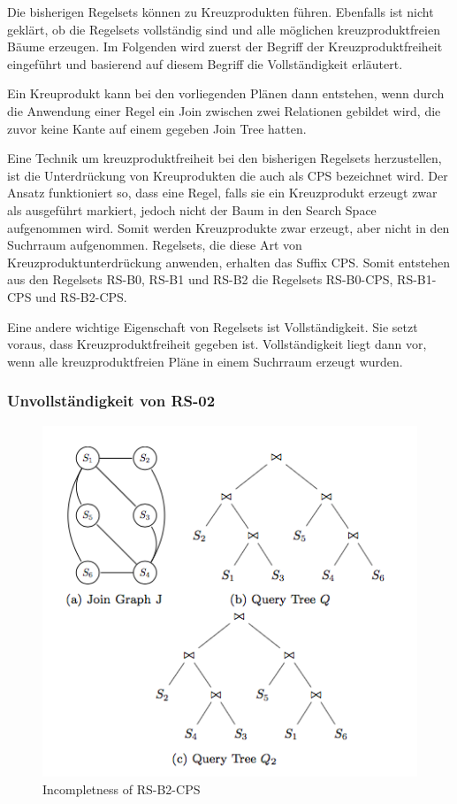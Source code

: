 Die bisherigen Regelsets können zu Kreuzprodukten führen. Ebenfalls ist nicht geklärt, ob die Regelsets vollständig sind und alle möglichen kreuzproduktfreien Bäume erzeugen. Im Folgenden wird zuerst der Begriff der Kreuzproduktfreiheit eingeführt und basierend auf diesem Begriff die Vollständigkeit erläutert.

Ein Kreuprodukt kann bei den vorliegenden Plänen dann entstehen, wenn durch die Anwendung einer Regel ein Join zwischen zwei Relationen gebildet wird, die zuvor keine Kante auf einem gegeben Join Tree hatten.

Eine Technik um kreuzproduktfreiheit bei den bisherigen Regelsets herzustellen, ist die Unterdrückung von Kreuprodukten die auch als \ac{CPS} bezeichnet wird. Der Ansatz funktioniert so, dass eine Regel, falls sie ein Kreuzprodukt erzeugt zwar als ausgeführt markiert, jedoch nicht der Baum in den Search Space aufgenommen wird. Somit werden Kreuzprodukte zwar erzeugt, aber nicht in den Suchrraum aufgenommen. Regelsets, die diese Art von Kreuzproduktunterdrückung anwenden, erhalten das Suffix CPS. Somit entstehen aus den Regelsets RS-B0, RS-B1 und RS-B2 die Regelsets RS-B0-CPS, RS-B1-CPS und RS-B2-CPS.


Eine andere wichtige Eigenschaft von Regelsets ist Vollständigkeit. Sie setzt voraus, dass Kreuzproduktfreiheit gegeben ist. Vollständigkeit liegt dann vor, wenn alle kreuzproduktfreien Pläne in einem Suchrraum erzeugt wurden.


\subsubsection{Unvollständigkeit von RS-02}


\begin{figure}[h]
  \centering
  \includegraphics[width=\textwidth]{03_Related_Work/Incompleteness_RS-B2-CPS.png}
  \caption{Incompletness of RS-B2-CPS}
  \label{Incompleteness_RS-B2-CPS}
\end{figure}


